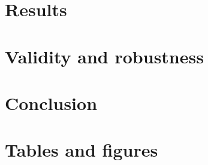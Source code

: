 \documentclass{article}
\begin{document}
\section{Results}


\section{Validity and robustness}


\section{Conclusion}




\newpage
\onehalfspacing



\newpage
\section*{Tables and figures}
\end{document}
